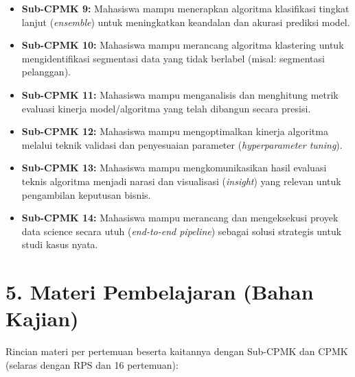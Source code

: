 \documentclass[12pt,a4paper]{article}
\begin{document}
\begin{itemize}[leftmargin=*]
  \item \textbf{Sub-CPMK 9:} Mahasiswa mampu menerapkan algoritma klasifikasi tingkat lanjut (\textit{ensemble}) untuk meningkatkan keandalan dan akurasi prediksi model.

  \item \textbf{Sub-CPMK 10:} Mahasiswa mampu merancang algoritma klastering untuk mengidentifikasi segmentasi data yang tidak berlabel (misal: segmentasi pelanggan).

  \item \textbf{Sub-CPMK 11:} Mahasiswa mampu menganalisis dan menghitung metrik evaluasi kinerja model/algoritma yang telah dibangun secara presisi.

  \item \textbf{Sub-CPMK 12:} Mahasiswa mampu mengoptimalkan kinerja algoritma melalui teknik validasi dan penyesuaian parameter (\textit{hyperparameter tuning}).

  \item \textbf{Sub-CPMK 13:} Mahasiswa mampu mengkomunikasikan hasil evaluasi teknis algoritma menjadi narasi dan visualisasi (\textit{insight}) yang relevan untuk pengambilan keputusan bisnis.

  \item \textbf{Sub-CPMK 14:} Mahasiswa mampu merancang dan mengeksekusi proyek data science secara utuh (\textit{end-to-end pipeline}) sebagai solusi strategis untuk studi kasus nyata.
\end{itemize}

\vspace{0.5cm}

\section*{5. Materi Pembelajaran (Bahan Kajian)}

Rincian materi per pertemuan beserta kaitannya dengan Sub-CPMK dan CPMK (selaras dengan RPS dan 16 pertemuan):
\end{document}
